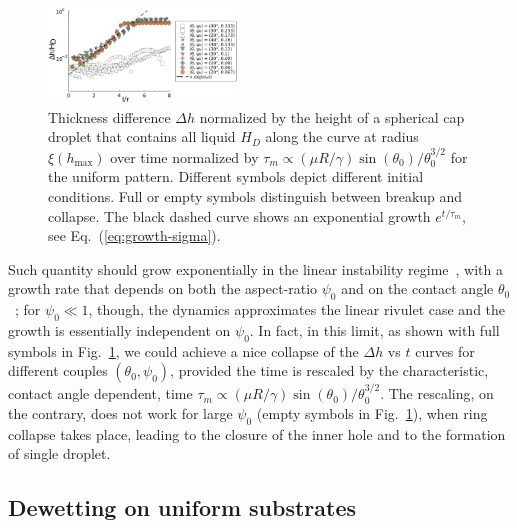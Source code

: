 \documentclass[twoside,twocolumn,9pt]{article}
\begin{document}
\begin{figure}
    \centering
    \includegraphics[width=0.45\textwidth]{assets/growth-breakup.pdf}
    \caption{Thickness difference $\Delta h$ normalized by the height of a spherical cap droplet that contains all liquid $H_D$ along the curve at radius $\xi(h_{\max})$ over time normalized by $\tau_m \propto (\mu R/\gamma) \sin(\theta_0)/\theta_0^{3/2}$ for the uniform pattern. 
    Different symbols depict different initial conditions. 
    Full or empty symbols distinguish between breakup and collapse. 
    The black dashed curve shows an exponential growth $e^{t/\tau_m}$, see Eq.~(\ref{eq:growth-sigma}).
    }
    \label{fig:first_growth}
\end{figure}
Such quantity should grow exponentially in the linear instability regime~\cite{wuBreakupPatternedNanoscale2010, gonzalezStabilityLiquidRing2013, nguyenCompetitionCollapseBreakup2012}, with a growth rate that depends on 
both the aspect-ratio $\psi_0$ and on the contact angle $\theta_0$~\cite{gonzalezStabilityLiquidRing2013}; for $\psi_0 \ll 1$, though, the dynamics approximates the 
linear rivulet case and the growth is essentially independent on $\psi_0$. In fact, in this limit, 
as shown with full symbols in Fig.~\ref{fig:first_growth}, we could achieve a nice collapse of the $\Delta h$ vs $t$ 
curves for different couples $(\theta_0,\psi_0)$, provided the time is rescaled by the characteristic, contact angle dependent, time 
$\tau_m \propto (\mu R/\gamma) \sin(\theta_0)/\theta_0^{3/2}$. 
The rescaling, on the contrary, does not work for large $\psi_0$ (empty symbols in Fig.~\ref{fig:first_growth}), when ring collapse takes place, leading to the closure of the inner hole 
and to the formation of single droplet.

\subsection{Dewetting on uniform substrates}\label{subsec:drop-counting}
\end{document}
